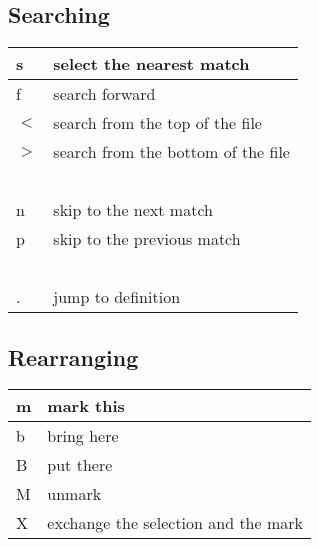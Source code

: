 \documentclass[landscape,letterpaper]{article}
\begin{document}
\begin{multicols}{2}
\subsection*{Searching}
 \begin{tabular}{|l|l|} \hline
       s         &   select the nearest match\\ \hline
       f          &  search forward \\ \hline
       $<$        &   search from the top of the file\\ \hline
       $>$        &   search from the bottom of the file\\ \hline
 ~ & ~ \\ \hline
       n       &     skip to the next match\\ \hline
       p        &    skip to the previous match\\ \hline
 ~ & ~ \\ \hline
       .          &  jump to definition \\ \hline
\end{tabular} 
 
\subsection*{Rearranging}
\begin{tabular}{|l|l|} \hline
       m&           mark this\\ \hline
       b        &    bring here\\ \hline
       B        &    put there\\ \hline
       M        &    unmark\\ \hline
       X        &    exchange the selection and the mark\\ \hline
\end{tabular} 
\end{multicols}

\newpage
 
\end{document}
